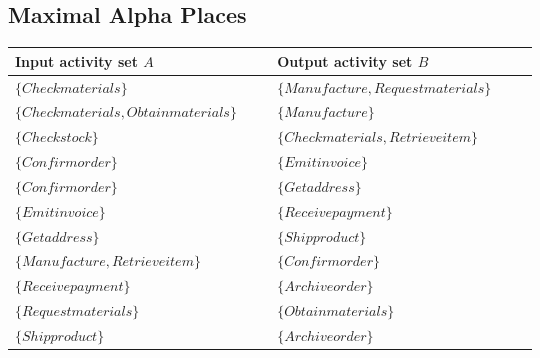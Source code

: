 \subsection{Maximal Alpha Places}
\begin{longtable}{p{0.45\linewidth}p{0.45\linewidth}}
\toprule
Input activity set $A$ & Output activity set $B$ \\
\midrule
$\{Check materials\}$ & $\{Manufacture, Request materials\}$ \\
$\{Check materials, Obtain materials\}$ & $\{Manufacture\}$ \\
$\{Check stock\}$ & $\{Check materials, Retrieve item\}$ \\
$\{Confirm order\}$ & $\{Emit invoice\}$ \\
$\{Confirm order\}$ & $\{Get address\}$ \\
$\{Emit invoice\}$ & $\{Receive payment\}$ \\
$\{Get address\}$ & $\{Ship product\}$ \\
$\{Manufacture, Retrieve item\}$ & $\{Confirm order\}$ \\
$\{Receive payment\}$ & $\{Archive order\}$ \\
$\{Request materials\}$ & $\{Obtain materials\}$ \\
$\{Ship product\}$ & $\{Archive order\}$ \\
\bottomrule
\end{longtable}
